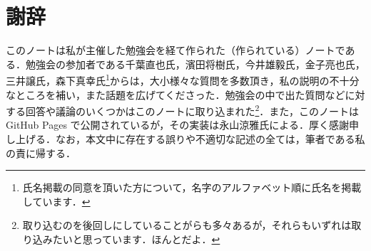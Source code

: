 \section*{謝辞}

このノートは私が主催した勉強会を経て作られた（作られている）ノートである．勉強会の参加者である千葉直也氏，濱田将樹氏，今井雄毅氏，金子亮也氏，三井譲氏，森下真幸氏\footnote{氏名掲載の同意を頂いた方について，名字のアルファベット順に氏名を掲載しています．}からは，大小様々な質問を多数頂き，私の説明の不十分なところを補い，また話題を広げてくださった．勉強会の中で出た質問などに対する回答や議論のいくつかはこのノートに取り込まれた\footnote{取り込むのを後回しにしていることがらも多々あるが，それらもいずれは取り込みたいと思っています．ほんとだよ．}．また，このノートは GitHub Pages で公開されているが，その実装は永山涼雅氏による．厚く感謝申し上げる．なお，本文中に存在する誤りや不適切な記述の全ては，筆者である私の責に帰する．